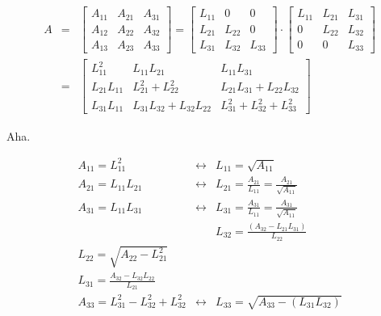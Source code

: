 \documentclass[11pt]{article} %
\theoremstyle{definition}
\begin{document}
\begin{eqnarray*}
A &=& \begin{bmatrix}
A_{11} & A_{21} & A_{31} \\
A_{12} & A_{22} & A_{32} \\
A_{13} & A_{23} & A_{33}
\end{bmatrix} = \begin{bmatrix}
L_{11} & 0 & 0 \\
L_{21} & L_{22} &  0 \\
L_{31} & L_{32} & L_{33}
\end{bmatrix} \cdot \begin{bmatrix}
L_{11} & L_{21} & L_{31} \\
0 & L_{22} & L_{32} \\
0 & 0 & L_{33}
\end{bmatrix} \\
&=& \begin{bmatrix}
L_{11}^2 & L_{11}L_{21} & L_{11}L_{31} \\
L_{21}L_{11} & L_{21}^2 + L_{22}^2 & L_{21}L_{31} + L_{22}L_{32} \\
L_{31}L_{11} & L_{31}L_{32} + L_{32}L_{22} & L_{31}^2 + L_{32}^2 + L_{33}^2
\end{bmatrix}
\end{eqnarray*}

Aha.

\begin{eqnarray*}
A_{11} = L_{11}^2 &\leftrightarrow& L_{11} = \sqrt{A_{11}} \\
A_{21} = L_{11}L_{21} &\leftrightarrow& L_{21} = \frac{A_{21}}{L_{11}} = \frac{A_{21}}{\sqrt{A_{11}}} \\
A_{31} = L_{11}L_{31} &\leftrightarrow& L_{31} = \frac{A_{31}}{L_{11}} = \frac{A_{31}}{\sqrt{A_{11}}} \\
&& L_{32} = \frac{(A_{32} - L_{21}L_{31})}{L_{22}} \\
L_{22} = \sqrt{A_{22} - L_{21}^2} && \\
L_{31} = \frac{A_{32} - L_{32}L_{22}}{L_{21}} && \\
A_{33} = L_{31}^2-L_{32}^2 + L_{32}^2 &\leftrightarrow& L_{33} = \sqrt{A_{33}- (L_{31}L_{32})}
\end{eqnarray*}
\end{document}
